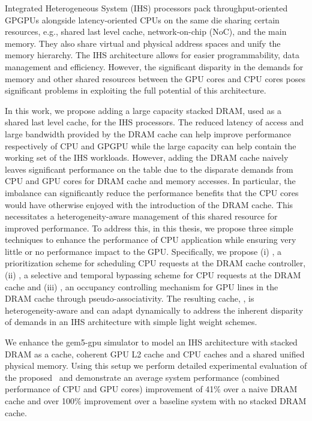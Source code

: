 \par Integrated Heterogeneous System (IHS) processors pack throughput-oriented GPGPUs alongside latency-oriented CPUs on the same die sharing certain resources, e.g., shared last level cache, network-on-chip (NoC), and the main memory. They also share virtual and physical address spaces and unify the memory hierarchy. The IHS architecture allows for easier programmability, data management and efficiency. However, the significant disparity in the demands for memory and other shared resources between the GPU cores and CPU cores poses significant problems in exploiting the full potential of this architecture.
\par In this work, we propose adding a large capacity stacked DRAM, used as a shared last level cache, for the IHS processors. The reduced latency of access and large bandwidth provided by the DRAM cache can help improve performance respectively of CPU and GPGPU while the large capacity can help contain the working set of the IHS workloads. However, adding the DRAM cache naively leaves significant performance on the table due to the disparate demands from CPU and GPU cores for DRAM cache and memory accesses. 
In particular, the imbalance can significantly reduce the performance benefits that the CPU cores would have otherwise enjoyed with the introduction of the DRAM cache. This necessitates a heterogeneity-aware management of this shared resource for improved performance. To address this, in this thesis, we propose three simple techniques to enhance the performance of CPU application while ensuring very little or no performance impact to the GPU. Specifically, we propose (i) \prioname, a prioritization scheme for scheduling CPU
requests at the DRAM cache controller, (ii) \bypassname, a selective and temporal bypassing scheme for CPU requests at the DRAM cache and (iii) \chaining, an occupancy controlling mechanism for GPU lines in the DRAM cache through pseudo-associativity. The resulting cache, \cachename, is heterogeneity-aware and can adapt dynamically to address the inherent disparity of demands in an IHS architecture with simple light weight schemes. 
\par We enhance the gem5-gpu simulator to model an IHS architecture with stacked DRAM as a cache, coherent GPU L2 cache and CPU caches and a shared unified physical memory. Using this setup we perform detailed experimental evaluation of the proposed \cachename\ and demonstrate an average system performance (combined performance of CPU  and GPU cores) improvement of 41\% over a naive DRAM cache and over 100\% improvement over a baseline system with no stacked DRAM cache.
